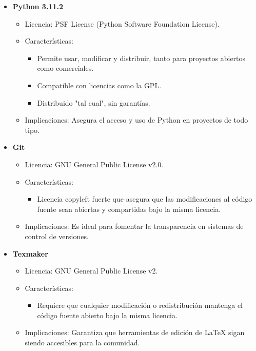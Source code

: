 \begin{itemize}
    \item \textbf{Python 3.11.2}  
        \begin{itemize}
            \item Licencia: PSF License (Python Software Foundation License).
            \item Características:
                \begin{itemize}
                    \item Permite usar, modificar y distribuir, tanto para proyectos abiertos como comerciales.
                    \item Compatible con licencias como la GPL.
                    \item Distribuido "tal cual", sin garantías.
                \end{itemize}
            \item Implicaciones: Asegura el acceso y uso de Python en proyectos de todo tipo.
        \end{itemize}

    \item \textbf{Git}  
        \begin{itemize}
            \item Licencia: GNU General Public License v2.0.
            \item Características:
                \begin{itemize}
                    \item Licencia copyleft fuerte que asegura que las modificaciones al código fuente sean abiertas y compartidas bajo la misma licencia.
                \end{itemize}
            \item Implicaciones: Es ideal para fomentar la transparencia en sistemas de control de versiones.
        \end{itemize}

    \item \textbf{Texmaker}  
        \begin{itemize}
            \item Licencia: GNU General Public License v2.
            \item Características:
                \begin{itemize}
                    \item Requiere que cualquier modificación o redistribución mantenga el código fuente abierto bajo la misma licencia.
                \end{itemize}
            \item Implicaciones: Garantiza que herramientas de edición de LaTeX sigan siendo accesibles para la comunidad.
        \end{itemize}
\end{itemize}


